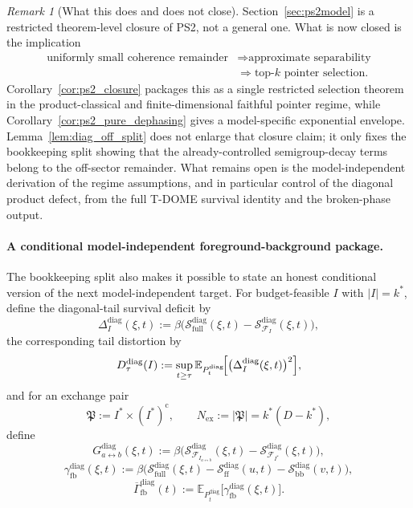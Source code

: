 \documentclass[12pt]{article}
\theoremstyle{definition}
\theoremstyle{remark}
\newtheorem{remark}[theorem]{Remark}
\begin{document}
\begin{remark}[What this does and does not close]
Section~\ref{sec:ps2model} is a restricted theorem-level closure of PS2,
not a general one. What is now closed is the implication
\[
\begin{aligned}
\text{uniformly small coherence remainder}
&\Longrightarrow
\text{approximate separability}
\\
&\Longrightarrow
\text{top-}k \text{ pointer selection}.
\end{aligned}
\]
Corollary~\ref{cor:ps2_closure} packages this as a single restricted
selection theorem in the product-classical and finite-dimensional
faithful pointer regime, while
Corollary~\ref{cor:ps2_pure_dephasing} gives a model-specific
exponential envelope. Lemma~\ref{lem:diag_off_split} does not enlarge
that closure claim; it only fixes the bookkeeping split showing that
the already-controlled semigroup-decay terms belong to the off-sector
remainder. What remains open is the model-independent derivation of the
regime assumptions, and in particular control of the diagonal product
defect, from the full T-DOME survival identity and the broken-phase
output.
\end{remark}

\paragraph{A conditional model-independent foreground-background package.}
The bookkeeping split also makes it possible to state an honest
conditional version of the next model-independent target. For
budget-feasible \(I\) with \(|I|=k^*\), define the diagonal-tail
survival deficit by
\[
\Delta_I^{\mathrm{diag}}(\xi,t)
:=
\beta\bigl(
\mathcal S_{\mathrm{full}}^{\mathrm{diag}}(\xi,t)
-
\mathcal S_{\mathcal F_I}^{\mathrm{diag}}(\xi,t)
\bigr),
\]
the corresponding tail distortion by
\[
D_\tau^{\mathrm{diag}}(I)
:=
\sup_{t\ge\tau}
\mathbb E_{P_t^{\mathrm{diag}}}\!\Bigl[
\bigl(\Delta_I^{\mathrm{diag}}(\xi,t)\bigr)^2
\Bigr],
\]
and for an exchange pair
\[
\mathfrak P:=I^*\times (I^*)^{\mathrm c},
\qquad
N_{\mathrm{ex}}:=|\mathfrak P|=k^*(D-k^*),
\]
define
\[
G_{a\leftrightarrow b}^{\mathrm{diag}}(\xi,t)
:=
\beta\bigl(
\mathcal S_{\mathcal F_{I_{a\leftrightarrow b}}}^{\mathrm{diag}}(\xi,t)
-
\mathcal S_{\mathcal F_{I^*}}^{\mathrm{diag}}(\xi,t)
\bigr),
\]
\[
\gamma_{\mathrm{fb}}^{\mathrm{diag}}(\xi,t)
:=
\beta\bigl(
\mathcal S_{\mathrm{full}}^{\mathrm{diag}}(\xi,t)
-
\mathcal S_{\mathrm{ff}}^{\mathrm{diag}}(u,t)
-
\mathcal S_{\mathrm{bb}}^{\mathrm{diag}}(v,t)
\bigr),
\]
\[
\overline{\Gamma}_{\mathrm{fb}}^{\mathrm{diag}}(t)
:=
\mathbb E_{P_t^{\mathrm{diag}}}\!\bigl[
\gamma_{\mathrm{fb}}^{\mathrm{diag}}(\xi,t)
\bigr].
\]
\end{document}
